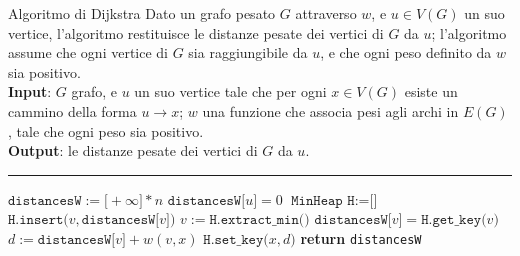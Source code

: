 \documentclass[a4paper, 12pt]{report}
\begin{document}
    \begin{framedalgo}{Algoritmo di Dijkstra}
        Dato un grafo pesato $G$ attraverso $w$, e $u \in V(G)$ un suo vertice, l'algoritmo restituisce le distanze pesate dei vertici di $G$ da $u$; l'algoritmo assume che ogni vertice di $G$ sia raggiungibile da $u$, e che ogni peso definito da $w$ sia positivo.\\
        \textbf{Input}: $G$ grafo, e $u$ un suo vertice tale che per ogni $x \in V(G)$ esiste un cammino della forma $u \rightarrow x$; $w$ una funzione che associa pesi agli archi in $E(G)$, tale che ogni peso sia positivo.\\
        \textbf{Output}: le distanze pesate dei vertici di $G$ da $u$.

        \hrule
        \begin{algorithmic}[1]
                \State $\texttt{distancesW} := \texttt{[}+ \infty \texttt{]} * n$ 
                \State $\texttt{distancesW[}u\texttt{]} = 0$
                \State $\texttt{MinHeap H} := \texttt{[]}$
                    \State $\texttt{H.insert(}v, \texttt{distancesW[}v\texttt{]}\texttt{)}$ 
                \EndFor
                    \State $v := \texttt{H.extract\_min()}$ 
                    \State $\texttt{distancesW[}v\texttt{]} = \texttt{H.get\_key(}v\texttt{)}$
                        \State $d := \texttt{distancesW[}v\texttt{]} + w(v, x)$
                            \State $\texttt{H.set\_key(}x, d\texttt{)}$
                        \EndIf
                    \EndFor
                \EndWhile
                \State \textbf{return} \texttt{distancesW}
            \EndFunction
        \end{algorithmic}
    \end{framedalgo}
\end{document}
